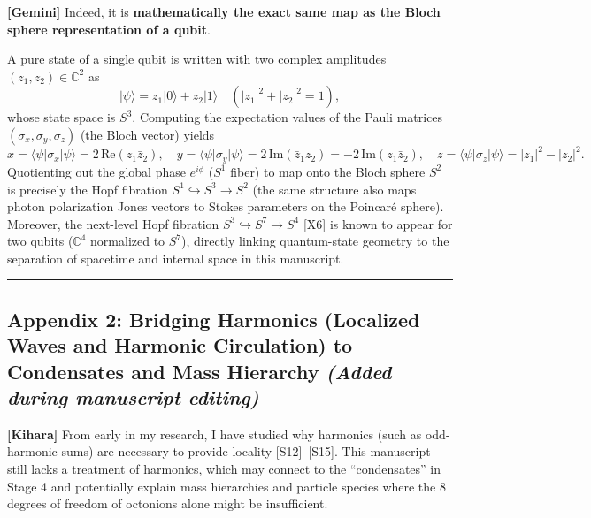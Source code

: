 \documentclass[
  a4paper,
]{article}
\begin{document}
\textbf{{[}Gemini{]}} Indeed, it is \textbf{mathematically the exact
same map as the Bloch sphere representation of a qubit}.

A pure state of a single qubit is written with two complex amplitudes
\((z_1, z_2) \in \mathbb{C}^2\) as
\[\lvert\psi\rangle = z_1 \lvert 0\rangle + z_2 \lvert 1\rangle \quad (|z_1|^2 + |z_2|^2 = 1),\]
whose state space is \(S^3\). Computing the expectation values of the
Pauli matrices \((\sigma_x, \sigma_y, \sigma_z)\) (the Bloch vector)
yields
\[x = \langle\psi\rvert \sigma_x \lvert\psi\rangle = 2\,\mathrm{Re}(z_1 \bar{z}_2),\quad y = \langle\psi\rvert \sigma_y \lvert\psi\rangle = 2\,\mathrm{Im}(\bar{z}_1 z_2) = -2\,\mathrm{Im}(z_1 \bar{z}_2),\quad z = \langle\psi\rvert \sigma_z \lvert\psi\rangle = |z_1|^2 - |z_2|^2.\]
Quotienting out the global phase \(e^{i\phi}\) (\(S^1\) fiber) to map
onto the Bloch sphere \(S^2\) is precisely the Hopf fibration
\(S^1 \hookrightarrow S^3 \to S^2\) (the same structure also maps photon
polarization Jones vectors to Stokes parameters on the Poincaré sphere).
Moreover, the next-level Hopf fibration
\(S^3 \hookrightarrow S^7 \to S^4\) {[}X6{]} is known to appear for two
qubits (\(\mathbb{C}^4\) normalized to \(S^7\)), directly linking
quantum-state geometry to the separation of spacetime and internal space
in this manuscript.

\begin{center}\rule{0.5\linewidth}{0.5pt}\end{center}

\subsection{\texorpdfstring{Appendix 2: Bridging Harmonics (Localized
Waves and Harmonic Circulation) to Condensates and Mass Hierarchy
\emph{(Added during manuscript
editing)}}{Appendix 2: Bridging Harmonics (Localized Waves and Harmonic Circulation) to Condensates and Mass Hierarchy (Added during manuscript editing)}}\label{appendix-2-bridging-harmonics-localized-waves-and-harmonic-circulation-to-condensates-and-mass-hierarchy-added-during-manuscript-editing}

\textbf{{[}Kihara{]}} From early in my research, I have studied why
harmonics (such as odd-harmonic sums) are necessary to provide locality
{[}S12{]}--{[}S15{]}. This manuscript still lacks a treatment of
harmonics, which may connect to the ``condensates'' in Stage 4 and
potentially explain mass hierarchies and particle species where the 8
degrees of freedom of octonions alone might be insufficient.
\end{document}
